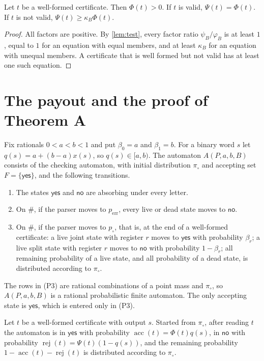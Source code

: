 \documentclass[11pt]{article}
\theoremstyle{plain}
\theoremstyle{definition}
\theoremstyle{remark}
\newcommand{\yes}{\mathsf{yes}}
\newcommand{\no}{\mathsf{no}}
\newcommand{\acc}{\operatorname{acc}}
\newcommand{\rej}{\operatorname{rej}}
\newcommand{\pin}{p_{\circ}}
\newcommand{\perr}{p_{\mathrm{err}}}
\begin{document}
\begin{corollary}\label{lem:dichotomy}
Let $t$ be a well-formed certificate. Then $\Phi(t)>0$. If $t$ is valid, $\Psi(t)=\Phi(t)$. If $t$ is not valid, $\Psi(t)\ge\kappa_B\Phi(t)$.
\end{corollary}

\begin{proof}
All factors are positive. By \cref{lem:test}, every factor ratio $\psi_B/\varphi_B$ is at least $1$, equal to $1$ for an equation with equal members, and at least $\kappa_B$ for an equation with unequal members. A certificate that is well formed but not valid has at least one such equation.
\end{proof}

\section{The payout and the proof of Theorem A}\label{sec:race}

Fix rationals $0<a<b<1$ and put $\beta_0=a$ and $\beta_1=b$. For a binary word $s$ let $q(s)=a+(b-a)x(s)$, so $q(s)\in[a,b)$. The automaton $A(P,a,b,B)$ consists of the checking automaton, with initial distribution $\pi_\circ$ and accepting set $F=\{\yes\}$, and the following transitions.
\begin{enumerate}[label=(P\arabic*)]
\item The states $\yes$ and $\no$ are absorbing under every letter.
\item On $\#$, if the parser moves to $\perr$, every live or dead state moves to $\no$.
\item On $\#$, if the parser moves to $\pin$, that is, at the end of a well-formed certificate: a live joint state with register $r$ moves to $\yes$ with probability $\beta_r$; a live split state with register $r$ moves to $\no$ with probability $1-\beta_r$; all remaining probability of a live state, and all probability of a dead state, is distributed according to $\pi_\circ$.
\end{enumerate}
The rows in (P3) are rational combinations of a point mass and $\pi_\circ$, so $A(P,a,b,B)$ is a rational probabilistic finite automaton. The only accepting state is $\yes$, which is entered only in (P3).

\begin{lemma}\label{lem:one}
Let $t$ be a well-formed certificate with output $s$. Started from $\pi_\circ$, after reading $t$ the automaton is in $\yes$ with probability $\acc(t)=\Phi(t)q(s)$, in $\no$ with probability $\rej(t)=\Psi(t)(1-q(s))$, and the remaining probability $1-\acc(t)-\rej(t)$ is distributed according to $\pi_\circ$.
\end{lemma}
\end{document}

